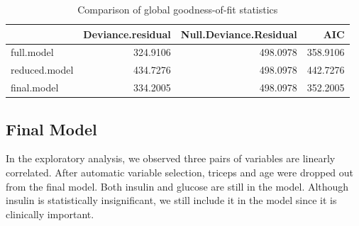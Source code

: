\documentclass[
]{book}
\newenvironment{Shaded}{\begin{snugshade}}{\end{snugshade}}
\newcommand{\AttributeTok}[1]{\textcolor[rgb]{0.13,0.29,0.53}{#1}}
\newcommand{\CommentTok}[1]{\textcolor[rgb]{0.56,0.35,0.01}{\textit{#1}}}
\newcommand{\FunctionTok}[1]{\textcolor[rgb]{0.13,0.29,0.53}{\textbf{#1}}}
\newcommand{\NormalTok}[1]{#1}
\newcommand{\OtherTok}[1]{\textcolor[rgb]{0.56,0.35,0.01}{#1}}
\newcommand{\SpecialCharTok}[1]{\textcolor[rgb]{0.81,0.36,0.00}{\textbf{#1}}}
\newcommand{\StringTok}[1]{\textcolor[rgb]{0.31,0.60,0.02}{#1}}
\begin{document}
\begin{table}

\caption{\label{tab:unnamed-chunk-124}Comparison of global goodness-of-fit statistics}
\centering
\begin{tabular}[t]{l|r|r|r}
\hline
  & Deviance.residual & Null.Deviance.Residual & AIC\\
\hline
full.model & 324.9106 & 498.0978 & 358.9106\\
\hline
reduced.model & 434.7276 & 498.0978 & 442.7276\\
\hline
final.model & 334.2005 & 498.0978 & 352.2005\\
\hline
\end{tabular}
\end{table}

\hypertarget{final-model-1}{%
\subsection{Final Model}\label{final-model-1}}

In the exploratory analysis, we observed three pairs of variables are linearly correlated. After automatic variable selection, triceps and age were dropped out from the final model. Both insulin and glucose are still in the model. Although insulin is statistically insignificant, we still include it in the model since it is clinically important.

\begin{Shaded}
\end{Shaded}
\end{document}
